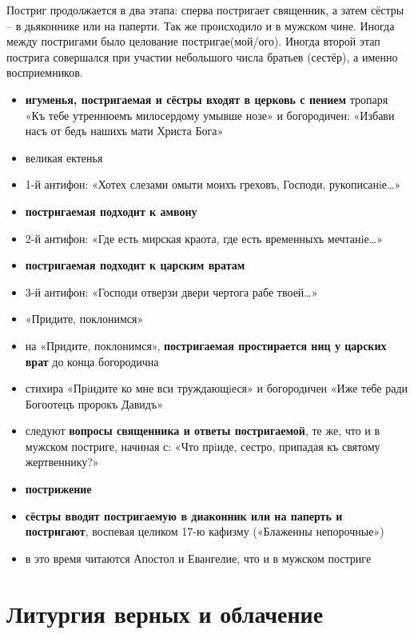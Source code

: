 Постриг продолжается в два этапа: сперва постригает священник, а затем сёстры -- в дьяконнике или на паперти.
Так же происходило и в мужском чине.
Иногда между постригами было целование постригае(мой/ого).
Иногда второй этап пострига совершался при участии небольшого числа братьев (сестёр), а именно восприемников.

\begin{itemize}
\tightlist
\item
  \textbf{игуменья, постригаемая и сёстры входят в церковь с пением} тропаря «Къ тебе утреннюемъ милосердому умывше нозе» и богородичен: «Избави насъ от бедъ нашихъ мати Христа Бога»
\item
  великая ектенья
\item
  1-й антифон: «Хотех слезами омыти моихъ греховъ, Господи, рукописанiе\ldots{}»
\item
  \textbf{постригаемая подходит к амвону}
\item
  2-й антифон: «Где есть мирская краота, где есть временныхъ мечтанiе\ldots{}»
\item
  \textbf{постригаемая подходит к царским вратам}
\item
  3-й антифон: «Господи отверзи двери чертога рабе твоей\ldots{}»
\item
  «Придите, поклонимся»
\item
  на «Придите, поклонимся», \textbf{постригаемая простирается ниц у царских врат} до конца богородична
\item
  стихира «Прiидите ко мне вси труждающiеся» и богородичен «Иже тебе ради Богоотецъ пророкъ Давидъ»
\item
  следуют \textbf{вопросы священника и ответы постригаемой}, те же, что и в мужском постриге, начиная с: «Что прiиде, сестро, припадая къ святому жертвеннику?»
\item
  \textbf{пострижение}
\item
  \textbf{сёстры вводят постригаемую в диаконник или на паперть и постригают}, воспевая целиком 17-ю кафизму («Блаженны непорочные»)
\item
  в это время читаются Апостол и Евангелие, что и в мужском постриге
\end{itemize}

\section*{Литургия верных и облачение}\label{ux43bux438ux442ux443ux440ux433ux438ux44f-ux432ux435ux440ux43dux44bux445-ux438-ux43eux431ux43bux430ux447ux435ux43dux438ux435}

